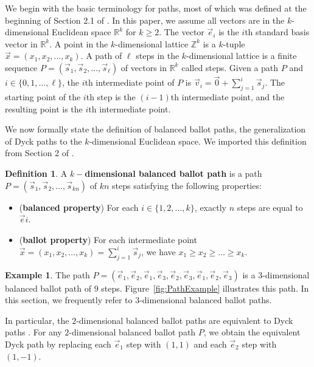 \documentclass[11pt]{article}
\theoremstyle{remark}
\theoremstyle{definition}
\newtheorem{definition}[theorem]{Definition}
\newtheorem{example}[theorem]{Example}
\begin{document}
We begin with the basic terminology for paths, most of which was defined at the beginning of Section 2.1 of \cite{MR5034574}. In this paper, we assume all vectors are in the $k$-dimensional Euclidean space $\mathbb{R}^k$ for $k \geq 2$. The vector $\vec{e}_i$ is the $i$th standard basis vector in $\mathbb{R}^k$. A point in the $k$-dimensional lattice $\mathbb{Z}^k$ is a $k$-tuple $\vec{x} = (x_1, x_2, \ldots, x_k)$. A path of $\ell$ steps in the $k$-dimensional lattice is a finite sequence $P= (\vec{s}_1, \vec{s}_2, \dots, \vec{s}_{\ell})$ of vectors in $\mathbb{R}^k$ called steps. Given a path $P$ and $i \in \{0, 1, \dots, \ell\}$, the $i$th intermediate point of $P$ is $\vec{v}_i = \vec{0}+\sum_{j=1}^i \vec{s}_j$. The starting point of the $i$th step is the $(i-1)$th intermediate point, and the resulting point is the $i$th intermediate point.

We now formally state the definition of balanced ballot paths, the generalization of Dyck paths to the $k$-dimensional Euclidean space. We imported this definition from Section 2 of \cite{MR5034574}.

\begin{definition}
\label{defn:k-dim-path}
A $k-$\textbf{dimensional balanced ballot path} is a path $P = (\vec{s}_1, \vec{s}_2, \dots, \vec{s}_{kn})$ of $kn$ steps satisfying the following properties:
\begin{itemize}
\item (\textbf{balanced property}) For each $i \in \{1, 2, \dots, k\}$, exactly $n$ steps are equal to $\vec{e}i$.
\item (\textbf{ballot property}) For each intermediate point $\vec{x} = (x_1, x_2, \dots, x_k) = \sum_{j=1}^{i}\vec{s}_j$, we have $x_1 \geq x_2 \geq \dots \geq x_k$.
\end{itemize}
\end{definition}
\begin{example}\label{ex:3Dpathexample}
The path $P = (\vec{e}_1,\vec{e}_2,\vec{e}_1, \vec{e}_3,\vec{e}_2,\vec{e}_3, \vec{e}_1,\vec{e}_2,\vec{e}_3)$ is a $3$-dimensional balanced ballot path of $9$ steps. Figure~\ref{fig:PathExample} illustrates this path. In this section, we frequently refer to $3$-dimensional balanced ballot paths.
\end{example}
In particular, the $2$-dimensional balanced ballot paths are equivalent to Dyck paths \cite{StanleyCatalan}.  For any $2$-dimensional balanced ballot path $P$, we obtain the equivalent Dyck path by replacing each $\vec{e}_1$ step with $(1, 1)$ and each $\vec{e}_2$ step with $(1, -1)$.
\end{document}
